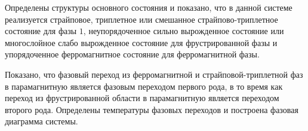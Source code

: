 Определены структуры основного состояния и показано, что в данной системе реализуется страйповое, триплетное или смешанное страйпово-триплетное состояние для фазы $1$, неупорядоченное сильно вырожденное состояние или многослойное слабо вырожденное состояние для фрустрированной фазы и упорядоченное ферромагнитное состояние для ферромагнитной фазы.

Показано, что фазовый переход из ферромагнитной и страйповой-триплетной фаз в парамагнитную является фазовым переходом первого рода, в то время как переход из фрустрированной области в парамагнитную является переходом второго рода. Определены температуры фазовых переходов и построена фазовая диаграмма системы.











